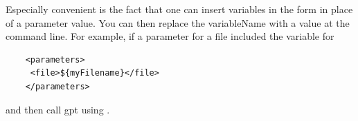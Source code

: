 Especially convenient is the fact that one can  insert variables in the form  in place
of a parameter value. You can then replace the variableName with a value at the command line.
For example, if a parameter for a file included the variable for 
\begin{lstlisting}
    <parameters>
     <file>${myFilename}</file>
    </parameters>
\end{lstlisting}
and then call gpt using .


